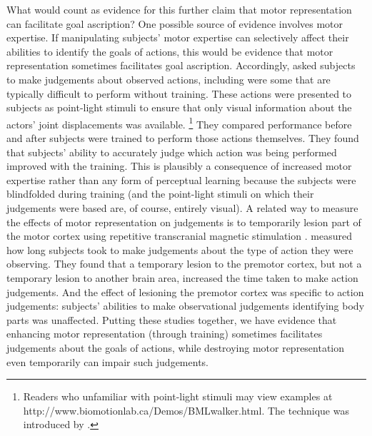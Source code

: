\documentclass[12pt,\papersize]{extarticle}
\begin{document}
What would count as evidence for this further claim that motor representation can facilitate goal ascription?  One possible source of evidence involves motor expertise. If manipulating subjects' motor expertise can selectively affect their abilities to identify the goals of actions, this would be evidence that motor representation sometimes facilitates goal ascription.  Accordingly, \citet{casile:2006_nonvisual} asked subjects to make judgements about observed actions, including were some that are typically difficult to perform without training.  These actions were presented to subjects as point-light stimuli to ensure that only visual information about the actors' joint displacements was available.%
\footnote{
Readers who unfamiliar with point-light stimuli may view examples at http://www.biomotionlab.ca/Demos/BMLwalker.html.
The technique was introduced by \citet{johansson:1973_visual}.
}
They compared performance before and after subjects were trained to perform those actions themselves. They found that subjects' ability to accurately judge which action was being performed improved with the training. This is plausibly a consequence of increased motor expertise rather than any form of perceptual learning because the subjects were blindfolded during training (and the point-light stimuli on which their judgements were based are, of course, entirely visual). A related way to measure the effects of motor representation on judgements is to temporarily lesion part of the motor cortex using repetitive transcranial magnetic stimulation  \citealp{urgesi:2007_representation, moro:2008_neural}.  \citet{urgesi:2007_representation} measured how long subjects took to make judgements about the type of action they were observing. They found that a temporary lesion to the premotor cortex, but not a temporary lesion to another brain area, increased the time taken to make action judgements. And the effect of lesioning the premotor cortex was specific to action judgements: subjects' abilities to make observational judgements identifying body parts was unaffected. Putting these studies together, we have evidence that enhancing motor representation (through training) sometimes facilitates judgements about the goals of actions, while destroying motor representation even temporarily can impair such judgements.
\end{document}
